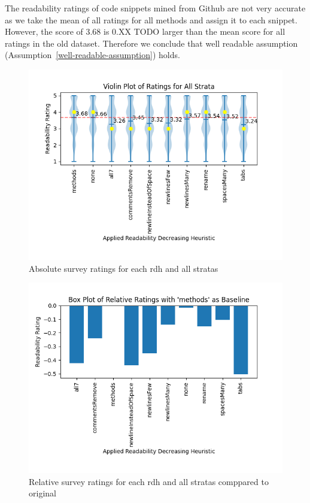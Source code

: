 \documentclass[%
class=scrreprt,
chapterprefix=false,%
open=right,%
twoside=false,%
paper=a4,%
logofile={Logo\_zentral\_farbig\_EN.png},%
thesistype=master,%
UKenglish,%
]{se2thesis}
\theoremstyle{definition}
\newenvironment{researchbox}[1]{\begin{tcolorbox}[colback=blue!10!white,colframe=blue!50!black,title=#1]}{\end{tcolorbox}}
\begin{document}
	\begin{researchbox}{Summary (RQ1 - select-well):}
		The readability ratings of code snippets mined from Github are not very accurate as we take the mean of all ratings for all methods and assign it to each snippet. However, the score of 3.68 is 0.XX TODO larger than the mean score for all ratings in the old dataset. Therefore we conclude that well readable assumption (Assumption~\ref{well-readable-assumption}) holds.
	\end{researchbox}
	
	\begin{figure}[t]
		\centering
		\includegraphics[width=\textwidth]{img/survey_ratings_violin_all.png}
		\caption{Absolute survey ratings for each rdh and all stratas}
		\label{fig:survey_ratings_violin_all}
	\end{figure}
	
	\begin{figure}[t]
		\centering
		\includegraphics[width=\textwidth]{img/survey_ratings_bar_all.png}
		\caption{Relative survey ratings for each rdh and all stratas comppared to original}
		\label{fig:survey_ratings_bar_all}
	\end{figure}
		
\end{document}
